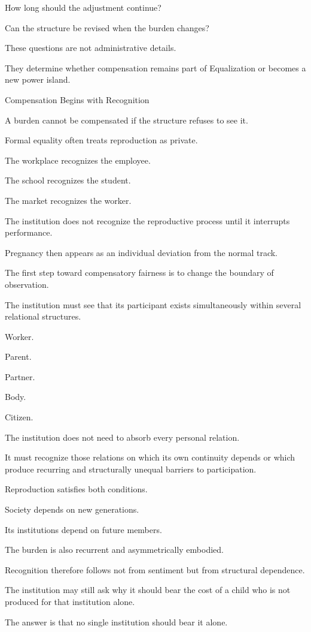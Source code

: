 How long should the adjustment continue?

Can the structure be revised when the burden changes?

These questions are not administrative details.

They determine whether compensation remains part of Equalization or becomes a new power island.

Compensation Begins with Recognition

A burden cannot be compensated if the structure refuses to see it.

Formal equality often treats reproduction as private.

The workplace recognizes the employee.

The school recognizes the student.

The market recognizes the worker.

The institution does not recognize the reproductive process until it interrupts performance.

Pregnancy then appears as an individual deviation from the normal track.

The first step toward compensatory fairness is to change the boundary of observation.

The institution must see that its participant exists simultaneously within several relational structures.

Worker.

Parent.

Partner.

Body.

Citizen.

The institution does not need to absorb every personal relation.

It must recognize those relations on which its own continuity depends or which produce recurring and structurally unequal barriers to participation.

Reproduction satisfies both conditions.

Society depends on new generations.

Its institutions depend on future members.

The burden is also recurrent and asymmetrically embodied.

Recognition therefore follows not from sentiment but from structural dependence.

The institution may still ask why it should bear the cost of a child who is not produced for that institution alone.

The answer is that no single institution should bear it alone.


